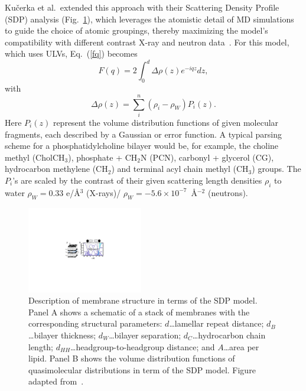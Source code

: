 \documentclass[8.5pt,twoside,twocolumn]{article}
\begin{document}
Ku\v{c}erka et al.~extended this approach with their Scattering Density Profile (SDP) analysis (Fig.~\ref{fig:SDP_model}), which leverages the atomistic detail of MD simulations to guide the choice of atomic groupings, thereby maximizing the model's compatibility with different contrast X-ray and neutron data~\cite{Kucerka.2008}. For this model, which uses ULVs, Eq.~(\ref{fq}) becomes 
\begin{equation}
	\label{eq:SDP_formfac}
	F(q) = 2 \int_{0}^{d} \Delta \rho(z) e^{-i q z} dz,
\end{equation}
with
\begin{equation}
	\Delta \rho(z)= \sum_{i}^{n} (\rho_i - \rho_W) P_i(z).
\end{equation}
%
Here $P_i(z)$ represent the volume distribution functions of given molecular fragments, each described by a Gaussian or error function. A typical parsing scheme for a phosphatidylcholine bilayer would be, for example, the choline methyl (CholCH$_3$), phosphate + CH$_2$N (PCN), carbonyl + glycerol (CG), hydrocarbon methylene (CH$_2$) and terminal acyl chain methyl (CH$_3$) groups. The $P_i$'s are scaled by the contrast of their given scattering length densities $\rho_i$ to water $\rho_W = 0.33$ e/\AA$^3$ (X-rays)/ $\rho_W = -5.6 \times 10^{-7}$~\AA$^{-2}$ (neutrons).
\begin{figure}
	\centering
	\includegraphics[width=0.45\textwidth]{figures/SDP_scheme}
	\caption{Description of membrane structure in terms of the SDP model. Panel A shows a schematic of a stack of membranes with the corresponding structural parameters: $d$\ldots lamellar repeat distance; $d_B$\ldots bilayer thickness; $d_W$\ldots bilayer separation; $d_C$\ldots hydrocarbon chain length; $d_{HH}$\ldots headgroup-to-headgroup distance; and $A$\ldots area per lipid. Panel B shows the volume distribution functions of quasimolecular distributions  in term of the SDP model. Figure adapted from~\cite{Kucerka.2011}.}
	\label{fig:SDP_model}
\end{figure}
\end{document}
